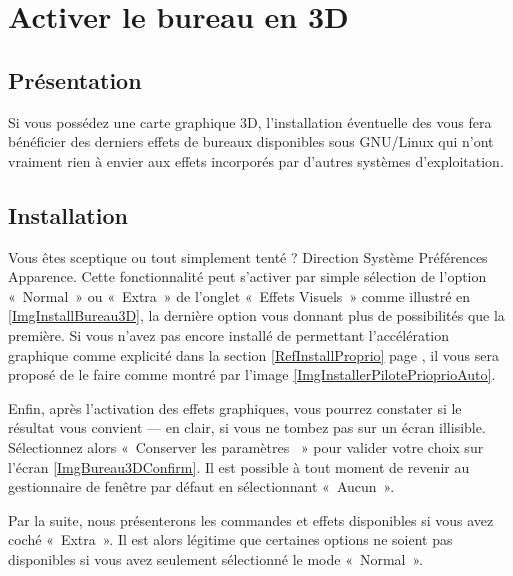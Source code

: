 \section{Activer le bureau en 3D}
\label{RefBureau3D}
\subsection{Présentation}
Si vous possédez une carte graphique 3D, l'installation éventuelle  des   vous fera bénéficier des derniers effets de bureaux disponibles sous GNU/Linux qui n'ont vraiment rien à envier aux effets incorporés par d'autres systèmes d'exploitation.\par
\subsection{Installation}
Vous êtes sceptique ou tout simplement tenté ? Direction Système \FlecheDroite Préférences \FlecheDroite Apparence. Cette fonctionnalité peut s'activer par simple sélection de l'option «~Normal~» ou «~Extra~» de l'onglet «~Effets Visuels~» comme illustré en \ref{ImgInstallBureau3D}, la dernière option vous donnant plus de possibilités que la première. Si vous n'avez pas encore installé de  permettant l'accélération graphique comme explicité dans la section \ref{RefInstallProprio} page \pageref{RefInstallProprio}, il vous sera proposé de le faire comme montré par l'image \ref{ImgInstallerPilotePrioprioAuto}.\par
\InstallBureauTroisD
Enfin, après l'activation des effets graphiques, vous pourrez constater si le résultat vous convient --- en clair, si vous ne tombez pas sur un écran illisible. Sélectionnez alors «~Conserver les paramètres ~» pour valider votre choix sur l'écran \ref{ImgBureau3DConfirm}. Il est possible à tout moment de revenir au gestionnaire de fenêtre par défaut en sélectionnant «~Aucun~».
\begin{attention}
Par la suite, nous présenterons les commandes et effets disponibles si vous avez coché «~Extra~». Il est alors légitime que certaines options ne soient pas disponibles si vous avez seulement sélectionné le mode «~Normal~».
\end{attention}
